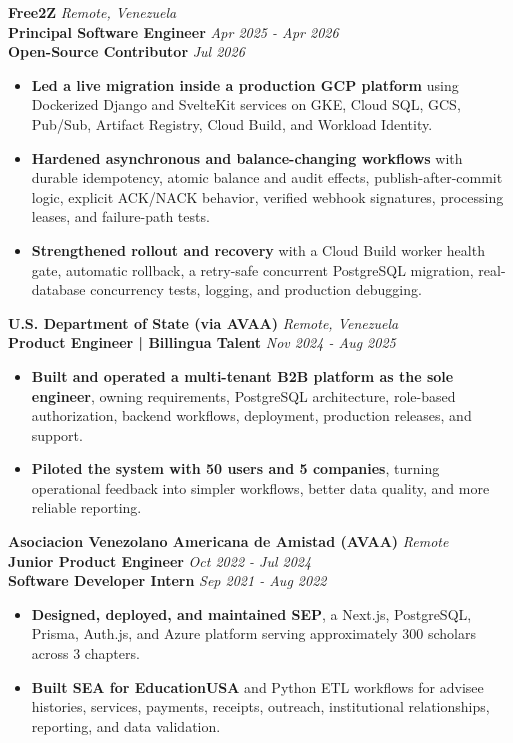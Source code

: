 \documentclass[10pt]{article}
\begin{document}
\vspace{1pt}
\textbf{Free2Z} \hfill \textit{Remote, Venezuela} \\
\textbf{Principal Software Engineer} \hfill \textit{Apr 2025 - Apr 2026} \\
\textbf{Open-Source Contributor} \hfill \textit{Jul 2026}
\begin{itemize}
    \item \textbf{Led a live migration inside a production GCP platform} using Dockerized Django and SvelteKit services on GKE, Cloud SQL, GCS, Pub/Sub, Artifact Registry, Cloud Build, and Workload Identity.
    \item \textbf{Hardened asynchronous and balance-changing workflows} with durable idempotency, atomic balance and audit effects, publish-after-commit logic, explicit ACK/NACK behavior, verified webhook signatures, processing leases, and failure-path tests.
    \item \textbf{Strengthened rollout and recovery} with a Cloud Build worker health gate, automatic rollback, a retry-safe concurrent PostgreSQL migration, real-database concurrency tests, logging, and production debugging.
\end{itemize}

\vspace{1pt}
\textbf{U.S. Department of State (via AVAA)} \hfill \textit{Remote, Venezuela} \\
\textbf{Product Engineer | Billingua Talent} \hfill \textit{Nov 2024 - Aug 2025}
\begin{itemize}
    \item \textbf{Built and operated a multi-tenant B2B platform as the sole engineer}, owning requirements, PostgreSQL architecture, role-based authorization, backend workflows, deployment, production releases, and support.
    \item \textbf{Piloted the system with 50 users and 5 companies}, turning operational feedback into simpler workflows, better data quality, and more reliable reporting.
\end{itemize}

\vspace{1pt}
\textbf{Asociacion Venezolano Americana de Amistad (AVAA)} \hfill \textit{Remote} \\
\textbf{Junior Product Engineer} \hfill \textit{Oct 2022 - Jul 2024} \\
\textbf{Software Developer Intern} \hfill \textit{Sep 2021 - Aug 2022}
\begin{itemize}
    \item \textbf{Designed, deployed, and maintained SEP}, a Next.js, PostgreSQL, Prisma, Auth.js, and Azure platform serving approximately 300 scholars across 3 chapters.
    \item \textbf{Built SEA for EducationUSA} and Python ETL workflows for advisee histories, services, payments, receipts, outreach, institutional relationships, reporting, and data validation.
\end{itemize}
\end{document}
